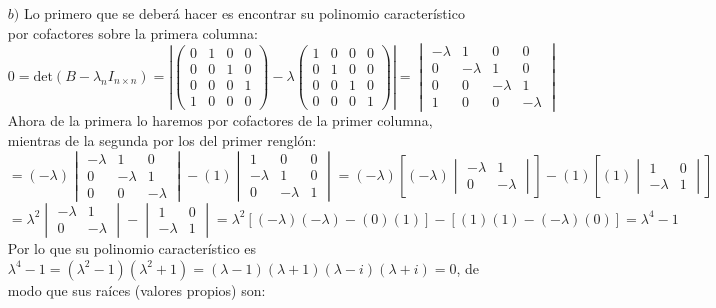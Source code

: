 \begin{enumerate}
\item[$b)$] Lo primero que se deber\'a hacer es encontrar su polinomio caracter\'istico por cofactores sobre la primera columna:
        \[0=\text{det}(B-\lambda_nI_{n\times n })=\left|\begin{pmatrix}0&1&0&0\\
0& 0 &1& 0\\
0&0&0&1\\
1&0&0&0\end{pmatrix}-\lambda\begin{pmatrix}
1 &0&0&0\\0 &1&0&0\\0 &0&1&0\\0 &0&0&1
\end{pmatrix}\right|=\begin{vmatrix}-\lambda&1&0&0\\
0& -\lambda &1& 0\\
0&0&-\lambda&1\\
1&0&0&-\lambda\end{vmatrix}\]Ahora de la primera lo haremos por cofactores de la primer columna, mientras de la segunda por los del primer rengl\'on:\[=(-\lambda)\begin{vmatrix}
 -\lambda &1& 0\\
0&-\lambda&1\\
0&0&-\lambda\end{vmatrix}-(1)\begin{vmatrix}1&0&0\\
 -\lambda &1& 0\\
0&-\lambda&1\end{vmatrix}=(-\lambda)\left[(-\lambda)\begin{vmatrix}
-\lambda&1\\
0&-\lambda\end{vmatrix}\right]-(1)\left[(1)\begin{vmatrix}
 1& 0\\
-\lambda&1\end{vmatrix}\right]\]\[=\lambda^2\begin{vmatrix}
-\lambda&1\\
0&-\lambda\end{vmatrix}-\begin{vmatrix}
 1& 0\\
-\lambda&1\end{vmatrix}=\lambda^2[(-\lambda)(-\lambda)-(0)(1)]-[(1)(1)-(-\lambda)(0)]=\lambda^4-1\]
Por lo que su polinomio caracter\'istico es $\lambda^4-1=(\lambda^2-1)(\lambda^2+1)=(\lambda-1)(\lambda+1)(\lambda-i)(\lambda+i)=0$, de modo que sus ra\'ices (valores propios) son:

\end{enumerate}
